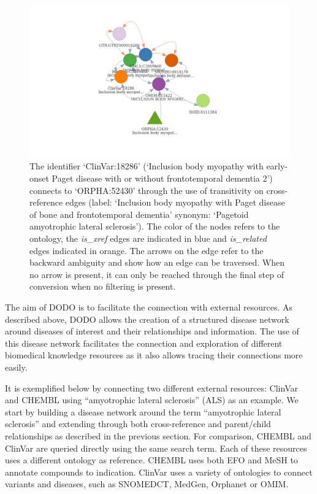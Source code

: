 \documentclass[9pt,a4paper,]{extarticle}
\begin{document}
\begin{figure}

{\centering \includegraphics[width=1.2\linewidth]{DODO-F1000-publication_files/figure-latex/disnetALSclinvar-1} 

}

\caption{The identifier `ClinVar:18286' (`Inclusion body myopathy with early-onset Paget disease with or without frontotemporal dementia 2') connects to `ORPHA:52430' through the use of transitivity on cross-reference edges (label: `Inclusion body myopathy with Paget disease of bone and frontotemporal dementia' synonym: `Pagetoid amyotrophic lateral sclerosis'). The color of the nodes refers to the ontology, the \emph{is\_xref} edges are indicated in blue and \emph{is\_related} edges indicated in orange. The arrows on the edge refer to the backward ambiguity and show how an edge can be traversed. When no arrow is present, it can only be reached through the final step of conversion when no filtering is present.}\label{fig:disnetALSclinvar}
\end{figure}

The aim of DODO is to facilitate the connection with external resources. As described above, DODO allows the creation of a structured disease network around diseases of interest and their relationships and information. The use of this disease network facilitates the connection and exploration of different biomedical knowledge resources as it also allows tracing their connections more easily.

It is exemplified below by connecting two different external resources: ClinVar and CHEMBL using ``amyotrophic lateral sclerosis'' (ALS) as an example. We start by building a disease network around the term ``amyotrophic lateral sclerosis'' and extending through both cross-reference and parent/child relationships as described in the previous section.
For comparison, CHEMBL and ClinVar are queried directly using the same search term. Each of these resources uses a different ontology as reference. CHEMBL uses both EFO and MeSH to annotate compounds to indication. ClinVar uses a variety of ontologies to connect variants and diseases, such as SNOMEDCT, MedGen, Orphanet or OMIM.
\end{document}
